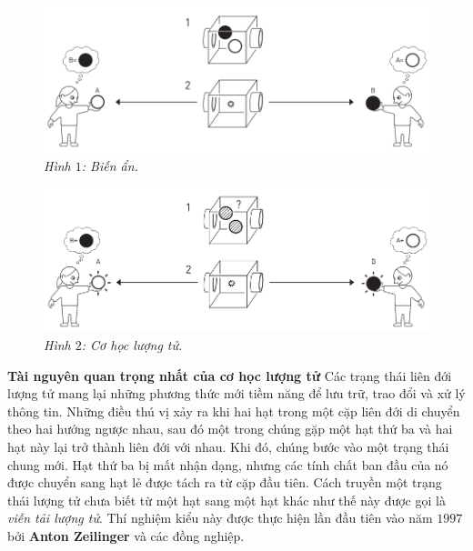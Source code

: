 \begin{multicols}{2}
\begin{figure}[H]
		\vspace*{-5pt}
		\centering
		\captionsetup{labelformat= empty, justification=centering}
		\includegraphics[width= 1\linewidth]{1}
		\caption{\small\textit{\color{timhieukhoahoc}Hình $1$: Biến ẩn.}}
		\vspace*{-10pt}
	\end{figure}
	\begin{figure}[H]
		\vspace*{-5pt}
		\centering
		\captionsetup{labelformat= empty, justification=centering}
		\includegraphics[width= 1\linewidth]{2}
		\caption{\small\textit{\color{timhieukhoahoc}Hình $2$: Cơ học lượng tử.}}
		\vspace*{-10pt}
	\end{figure}
	\textbf{\color{timhieukhoahoc}Tài nguyên quan trọng nhất của cơ học lượng tử}
	\vskip 0.1cm
	Các trạng thái liên đới lượng tử mang lại những phương thức mới tiềm năng để lưu trữ, trao đổi và xử lý thông tin.
	\vskip 0.1cm
	Những điều thú vị xảy ra khi hai hạt trong một cặp liên đới di chuyển theo hai hướng ngược nhau, sau đó một trong chúng gặp một hạt thứ ba và hai hạt này lại trở thành liên đới với nhau. Khi đó, chúng bước vào một trạng thái chung mới. Hạt thứ ba bị mất nhận dạng, nhưng các tính chất ban đầu của nó được chuyển sang hạt lẻ được tách ra từ cặp đầu tiên. Cách truyền một trạng thái lượng tử chưa biết từ một hạt sang một hạt khác như thế này được gọi là \textit{viễn tải lượng tử}. Thí nghiệm kiểu này được thực hiện lần đầu tiên vào năm $1997$ bởi \textbf{\color{timhieukhoahoc}Anton Zeilinger} và các đồng nghiệp.

\end{multicols}
